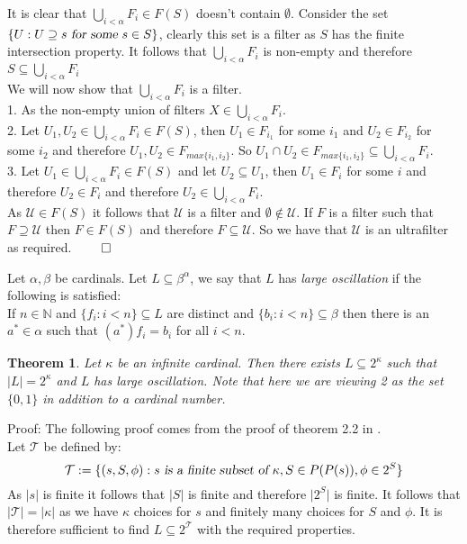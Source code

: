 \documentclass{report}
\newtheorem{theorem}{Theorem}[section]
\newenvironment{defn}[1][]{\refstepcounter{theorem}\begin{trivlist}
\item[\hskip \labelsep {\bfseries Definition  \thetheorem  \, \def\temp{#1}\ifx\temp\empty  #1\else  (#1)\fi
}]}   {\end{trivlist}}
\begin{document}
It is clear that $\bigcup_{i<\alpha} F_i \in F(S)$ doesn't contain $\emptyset$. Consider the set $\{U:U\supseteq s \textsl{ for some }s\in S\}$, clearly this set is a filter as $S$ has the finite intersection property. It follows that $\bigcup_{i<\alpha} F_i$ is non-empty and therefore $S \subseteq \bigcup_{i<\alpha} F_i $\\
We will now show that $\bigcup_{i<\alpha} F_i$ is a filter.\\
1. As the non-empty union of filters $X \in \bigcup_{i<\alpha} F_i$.\\
2. Let $U_1,U_2 \in \bigcup_{i<\alpha} F_i \in F(S)$, then $U_1\in F_{i_1}$ for some $i_1$ and $U_2\in F_{i_2}$ for some $i_2$ and therefore $U_1,U_2 \in F_{max\{i_1,i_2\}}$. So $U_1 \cap U_2 \in F_{max\{i_1,i_2\}} \subseteq \bigcup_{i<\alpha} F_i $.\\
3. Let $U_1 \in \bigcup_{i<\alpha} F_i \in F(S)$ and let $U_2 \subseteq U_1$, then $U_1\in F_i$ for some $i$ and therefore $U_2 \in F_i$ and therefore $U_2 \in \bigcup_{i<\alpha} F_i$.\\
As $\mathcal{U} \in F(S)$ it follows that $\mathcal{U}$ is a filter and $\emptyset \notin \mathcal{U}$. If $F$ is a filter such that $F \supseteq \mathcal{U}$ then $F\in F(S)$ and therefore $F \subseteq \mathcal{U}$. So we have that $\mathcal{U}$ is an ultrafilter as required. $\qed$
\begin{defn}
Let $\alpha, \beta$ be cardinals. Let $L \subseteq \beta^\alpha$, we say that $L$ has \textit{large oscillation} if the following is satisfied:\\
If $n\in \mathbb{N}$ and $\{f_i: i <n \}\subseteq L$ are distinct and $\{b_i:i < n\}\subseteq \beta$ then there is an $a^*\in \alpha$ such that $(a^*)f_i = b_i$ for all $i< n$.
\end{defn}
\begin{theorem}\label{large osc}
Let $\kappa$ be an infinite cardinal. Then there exists $L \subseteq 2^\kappa$ such that $\vert L \vert = 2^\kappa$ and $L$ has large oscillation. Note that here we are viewing 2 as the set $\{0,1\}$ in addition to a cardinal number.
\end{theorem}\par
Proof: The following proof comes from the proof of theorem 2.2 in \cite{no ultrafilters}.\\
Let $\mathcal{T}$ be defined by:
$$\mathcal{T} := \{(s,S,\phi): s\textsl{ is a finite subset of }\kappa, S\in P(P(s)), \phi \in 2^{S}\}$$
As $\vert s \vert$ is finite it follows that $\vert S \vert$ is finite and therefore $\vert 2^S \vert$ is finite. It follows that $\vert \mathcal{T} \vert =\vert \kappa \vert$ as we have $\kappa$ choices for $s$ and finitely many choices for $S$ and $\phi$. It is therefore sufficient to find $L \subseteq 2^\mathcal{T}$ with the required properties.\\
\end{document}
